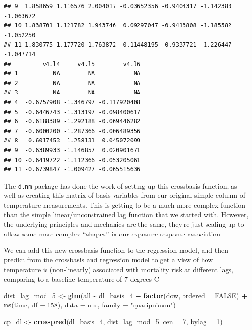 \documentclass[
]{book}
\newenvironment{Shaded}{\begin{snugshade}}{\end{snugshade}}
\newcommand{\AttributeTok}[1]{\textcolor[rgb]{0.13,0.29,0.53}{#1}}
\newcommand{\ConstantTok}[1]{\textcolor[rgb]{0.56,0.35,0.01}{#1}}
\newcommand{\DecValTok}[1]{\textcolor[rgb]{0.00,0.00,0.81}{#1}}
\newcommand{\FunctionTok}[1]{\textcolor[rgb]{0.13,0.29,0.53}{\textbf{#1}}}
\newcommand{\NormalTok}[1]{#1}
\newcommand{\OtherTok}[1]{\textcolor[rgb]{0.56,0.35,0.01}{#1}}
\newcommand{\SpecialCharTok}[1]{\textcolor[rgb]{0.81,0.36,0.00}{\textbf{#1}}}
\newcommand{\StringTok}[1]{\textcolor[rgb]{0.31,0.60,0.02}{#1}}
\begin{document}
\begin{verbatim}
## 9  1.858659 1.116576 2.004017 -0.03652356 -0.9404317 -1.142380 -1.063672
## 10 1.838701 1.121782 1.943746  0.09297047 -0.9413808 -1.185582 -1.052250
## 11 1.830775 1.177720 1.763872  0.11448195 -0.9337721 -1.226447 -1.047714
##         v4.l4     v4.l5        v4.l6
## 1          NA        NA           NA
## 2          NA        NA           NA
## 3          NA        NA           NA
## 4  -0.6757908 -1.346797 -0.117920408
## 5  -0.6446743 -1.313197 -0.098400617
## 6  -0.6188389 -1.292188 -0.069446282
## 7  -0.6000200 -1.287366 -0.006489356
## 8  -0.6017453 -1.258131  0.045072099
## 9  -0.6389933 -1.146857  0.020901671
## 10 -0.6419722 -1.112366 -0.053205061
## 11 -0.6739847 -1.009427 -0.065515636
\end{verbatim}

The \texttt{dlnm} package has done
the work of setting up this crossbasis function, as well as creating this matrix of
basis variables from our original simple column of temperature measurements. This
is getting to be a much more complex function than the simple linear/unconstrained lag
function that we started with. However, the underlying principles and mechanics are the
same, they're just scaling up to allow some more complex ``shapes'' in our exposure-response
association.

We can add this new crossbasis function to the regression model, and then predict from
the crossbasis and regression model to get a view of how temperature is (non-linearly) associated
with mortality risk at different lags, comparing to a baseline temperature of 7 degrees C:

\begin{Shaded}
\begin{Highlighting}[]
\NormalTok{dist\_lag\_mod\_5 }\OtherTok{\textless{}{-}} \FunctionTok{glm}\NormalTok{(all }\SpecialCharTok{\textasciitilde{}}\NormalTok{ dl\_basis\_4 }\SpecialCharTok{+} 
                        \FunctionTok{factor}\NormalTok{(dow, }\AttributeTok{ordered =} \ConstantTok{FALSE}\NormalTok{) }\SpecialCharTok{+}
                          \FunctionTok{ns}\NormalTok{(time, }\AttributeTok{df =} \DecValTok{158}\NormalTok{), }
                        \AttributeTok{data =}\NormalTok{ obs, }\AttributeTok{family =} \StringTok{"quasipoisson"}\NormalTok{)}

\NormalTok{cp\_dl }\OtherTok{\textless{}{-}} \FunctionTok{crosspred}\NormalTok{(dl\_basis\_4, dist\_lag\_mod\_5, }\AttributeTok{cen =} \DecValTok{7}\NormalTok{, }\AttributeTok{bylag =} \DecValTok{1}\NormalTok{)}
\end{Highlighting}
\end{Shaded}
\end{document}
